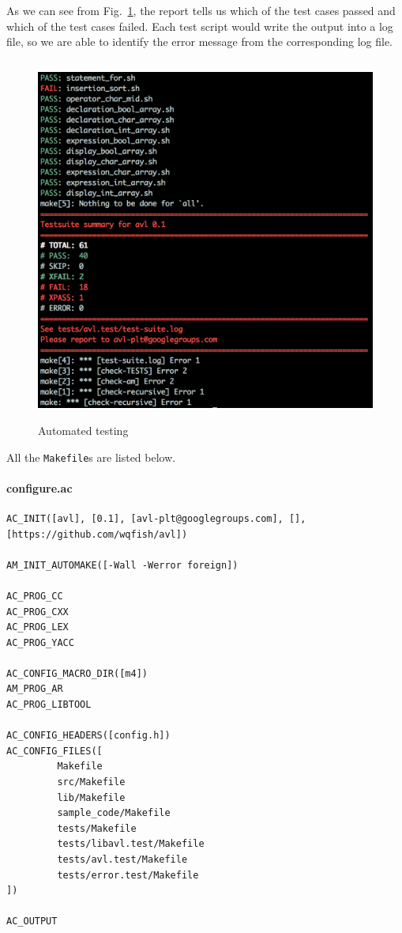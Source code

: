As we can see from Fig.~\ref{fig:automake}, the report tells us which of the test cases passed and which of the test cases
failed. Each test script would write the output into a log file, so we are able to identify the
error message from the corresponding log file.

\begin{figure}[htp]
  \centering
  \includegraphics[height=12cm]{automake.png}
  \caption{Automated testing}
  \label{fig:automake}
\end{figure}

All the \verb"Makefile"s are listed below.

\paragraph{configure.ac}

\begin{verbatim}
AC_INIT([avl], [0.1], [avl-plt@googlegroups.com], [],
[https://github.com/wqfish/avl])

AM_INIT_AUTOMAKE([-Wall -Werror foreign])

AC_PROG_CC
AC_PROG_CXX
AC_PROG_LEX
AC_PROG_YACC

AC_CONFIG_MACRO_DIR([m4])
AM_PROG_AR
AC_PROG_LIBTOOL

AC_CONFIG_HEADERS([config.h])
AC_CONFIG_FILES([
         Makefile
         src/Makefile
         lib/Makefile
         sample_code/Makefile
         tests/Makefile
         tests/libavl.test/Makefile
         tests/avl.test/Makefile
         tests/error.test/Makefile
])

AC_OUTPUT
\end{verbatim}

